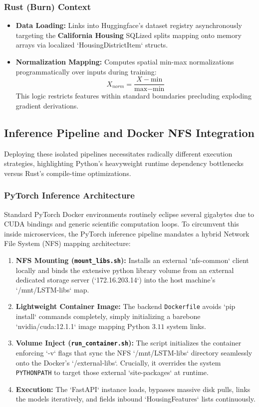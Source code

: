 \documentclass{ieeeaccess}
\begin{document}
\subsubsection{Rust (Burn) Context}
\begin{itemize}
    \item \textbf{Data Loading:} Links into Huggingface's dataset registry asynchronously targeting the \textbf{California Housing} SQLized splits mapping onto memory arrays via localized `HousingDistrictItem` structs.
    \item \textbf{Normalization Mapping:} Computes spatial min-max normalizations programmatically over inputs during training:
    \[ X_{norm} = \frac{X - \text{min}}{\text{max} - \text{min}} \]
    This logic restricts features within standard boundaries precluding exploding gradient derivations.
\end{itemize}

\subsection{Inference Pipeline and Docker NFS Integration}

Deploying these isolated pipelines necessitates radically different execution strategies, highlighting Python's heavyweight runtime dependency bottlenecks versus Rust's compile-time optimizations.

\subsubsection{PyTorch Inference Architecture}
Standard PyTorch Docker environments routinely eclipse several gigabytes due to CUDA bindings and generic scientific computation loops. To circumvent this inside microservices, the PyTorch inference pipeline mandates a hybrid Network File System (NFS) mapping architecture:
\begin{enumerate}
    \item \textbf{NFS Mounting (\texttt{mount\_libs.sh}):} Installs an external `nfs-common` client locally and binds the extensive python library volume from an external dedicated storage server (`172.16.203.14`) into the host machine's `/mnt/LSTM-libs` map.
    \item \textbf{Lightweight Container Image:} The backend \texttt{Dockerfile} avoids `pip install` commands completely, simply initializing a barebone `nvidia/cuda:12.1.1` image mapping Python $3.11$ system links. 
    \item \textbf{Volume Inject (\texttt{run\_container.sh}):} The script initializes the container enforcing `-v` flags that sync the NFS `/mnt/LSTM-libs` directory seamlessly onto the Docker's `/external-libs`. Crucially, it overrides the system \texttt{PYTHONPATH} to target those external `site-packages` at runtime.
    \item \textbf{Execution:} The `FastAPI` instance loads, bypasses massive disk pulls, links the models iteratively, and fields inbound `HousingFeatures` lists continuously.
\end{enumerate}
\end{document}
